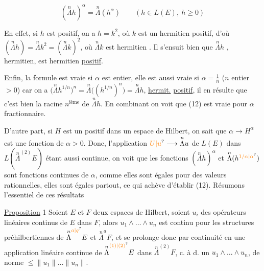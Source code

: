 \[
(\overset{n}{\Lambda}h)^\alpha=\overset{n}{\Lambda}(h^\alpha)\qquad(h\in L(E),\ h\geq0)\tag*{(12)}
\]

En effet, si $h$ est positif, on a $h=k^2$, où $k$ est un hermitien positif, d'où $(\overset{n}{\Lambda}h)=\overset{n}{\Lambda}k^2=(\overset{n}{\Lambda}k)^2$, où $\overset{n}{\Lambda}k$ est hermitien 
. Il s'ensuit bien que $\overset{n}{\Lambda}h$ ,   hermitien, est hermitien \uline{positif}.

Enfin, la formule  est vraie si $\alpha$ est entier, elle est aussi vraie si $\alpha=\frac1n$ ($n$ entier $>0$) car on a $\bigl(\overset{n}{\Lambda}h^{1/n}\bigr)^n=\overset{n}{\Lambda}\bigl((h^{1/n})^n\bigr)=\overset{n}{\Lambda}h$,   \uline{hermit.} \uline{positif}, il en résulte que c'est bien la racine $n^{\text{ième}}$ de $\overset{n}{\Lambda}h$.  En combinant on voit que (12) est vraie pour $\alpha$ fractionnaire.

D'autre part, si $H$ est un  positif dans un espace de Hilbert, on sait que $\alpha\longrightarrow H^\alpha$ est une fonction  de $\alpha>0$.  Donc, l'application $\unsure{U|u}\longrightarrow\overset{n}{\Lambda}u$ de $L(E)$ dans $L(\overset{n}{\Lambda}^{(2)}E)$ étant aussi continue, on voit que les fonctions $(\overset{n}{\Lambda}h)^\alpha$ et $\overset{n}{\Lambda}(h^{\unsure{1/\alpha|\alpha}})$ sont fonctions continues de $\alpha$,  comme elles sont égales pour des valeurs rationnelles, elles sont égales partout, ce qui achève d'établir (12). Résumons l'essentiel de ces résultats

\uline{Proposition} 1 Soient $E$ et $F$ deux espaces de Hilbert, soient $u_i$   des opérateurs linéaires continus de $E$ dans $F$, alors $u_1\wedge\ldots\wedge u_n$ est continu pour les structures préhilbertiennes de $\overset{n}{\Lambda}^{\unsure{a|q}}E$ et $\overset{n}{\Lambda}^{a}F$, et se prolonge donc par continuité en une application linéaire continue de $\overset{n}{\Lambda}^{\unsure{(1)|(2)}}E$ dans $\overset{n}{\Lambda}^{(2)}F$,  c. à d. un $u_1\wedge\ldots\wedge u_n$,  de norme $\leq\lVert u_1\rVert\ldots\lVert u_n\rVert$.

